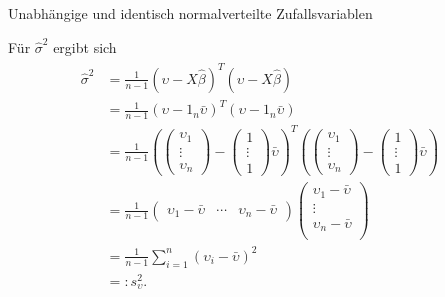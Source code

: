 \documentclass[
  8pt,
  ignorenonframetext,
]{beamer}
\begin{document}
\begin{frame}{Unabhängige und identisch normalverteilte
Zufallsvariablen}
\protect\hypertarget{unabhuxe4ngige-und-identisch-normalverteilte-zufallsvariablen-2}{}
\small

Für \(\hat{\sigma}^2\) ergibt sich \begin{align*}
\begin{split}
\hat{\sigma}^2
& = \frac{1}{n-1}\left(\upsilon-X\hat{\beta}\right)^T\left(\upsilon-X\hat{\beta} \right)
\\
& = \frac{1}{n-1}\left(\upsilon-1_n\bar{\upsilon}\right)^T\left(\upsilon-1_n\bar{\upsilon}\right)
\\
& = \frac{1}{n-1}
\left(
\begin{pmatrix} \upsilon_1  \\  \vdots  \\  \upsilon_n  \end{pmatrix} -
\begin{pmatrix} 1           \\  \vdots  \\  1           \end{pmatrix}
\bar{\upsilon}
\right)^T
\left(
\begin{pmatrix} \upsilon_1  \\  \vdots  \\  \upsilon_n  \end{pmatrix} -
\begin{pmatrix} 1           \\  \vdots  \\  1           \end{pmatrix}
\bar{\upsilon}
\right)
\\
& =
\frac{1}{n-1}
\begin{pmatrix}
\upsilon_{1}-\bar{\upsilon}
& \cdots
& \upsilon_{n}-\bar{\upsilon}
\end{pmatrix}
\begin{pmatrix}
\upsilon_{1}-\bar{\upsilon} \\
\vdots \\
\upsilon_{n}-\bar{\upsilon} \\
\end{pmatrix}
\\
& = \frac{1}{n-1} \sum_{i=1}^n \left(\upsilon_i-\bar{\upsilon} \right)^2
\\
& =: s^2_\upsilon.
\end{split}
\end{align*}
\end{frame}
\end{document}
